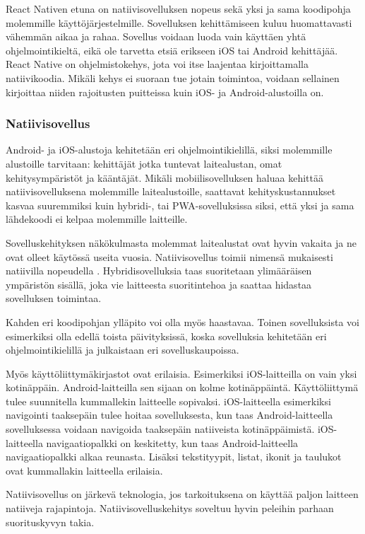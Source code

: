 \documentclass{tktltiki}
\begin{document}
React Nativen etuna on natiivisovelluksen nopeus sekä yksi ja sama koodipohja molemmille käyttöjärjestelmille. Sovelluksen kehittämiseen kuluu huomattavasti vähemmän aikaa ja rahaa. Sovellus voidaan luoda vain käyttäen yhtä ohjelmointikieltä, eikä ole tarvetta etsiä erikseen iOS tai Android kehittäjää. React Native on ohjelmistokehys, jota voi itse laajentaa kirjoittamalla natiivikoodia. Mikäli kehys ei suoraan tue jotain toimintoa, voidaan sellainen kirjoittaa niiden rajoitusten puitteissa kuin iOS- ja Android-alustoilla on.

\subsubsection{Natiivisovellus}

Android- ja iOS-alustoja kehitetään eri ohjelmointikielillä, siksi molemmille alustoille tarvitaan: kehittäjät jotka tuntevat laitealustan, omat kehitysympäristöt ja kääntäjät. Mikäli mobiilisovelluksen haluaa kehittää natiivisovelluksena molemmille laitealustoille, saattavat kehityskustannukset kasvaa suuremmiksi kuin hybridi-, tai PWA-sovelluksissa siksi, että yksi ja sama lähdekoodi ei kelpaa molemmille laitteille. 

Sovelluskehityksen näkökulmasta molemmat laitealustat ovat hyvin vakaita ja ne ovat olleet käytössä useita vuosia. Natiivisovellus toimii nimensä mukaisesti natiivilla nopeudella \cite{6588524}. Hybridisovelluksia taas suoritetaan ylimääräisen ympäristön sisällä, joka vie laitteesta suoritintehoa ja saattaa hidastaa sovelluksen toimintaa. 

Kahden eri koodipohjan ylläpito voi olla myös haastavaa. Toinen sovelluksista voi esimerkiksi olla edellä toista päivityksissä, koska sovelluksia kehitetään eri ohjelmointikielillä ja julkaistaan eri sovelluskaupoissa.

Myös käyttöliittymäkirjastot ovat erilaisia. Esimerkiksi iOS-laitteilla on vain yksi kotinäppäin. Android-laitteilla sen sijaan on kolme kotinäppäintä. \cite{Sojka} Käyttöliittymä tulee suunnitella kummallekin laitteelle sopivaksi. iOS-laitteella esimerkiksi navigointi taaksepäin tulee hoitaa sovelluksesta, kun taas Android-laitteella sovelluksessa voidaan navigoida taaksepäin natiiveista kotinäppäimistä. iOS-laitteella navigaatiopalkki on keskitetty, kun taas Android-laitteella navigaatiopalkki alkaa reunasta. Lisäksi tekstityypit, listat, ikonit ja taulukot ovat kummallakin laitteella erilaisia.

Natiivisovellus on järkevä teknologia, jos tarkoituksena on käyttää paljon laitteen natiiveja rajapintoja. Natiivisovelluskehitys soveltuu hyvin peleihin parhaan suorituskyvyn takia. 
\end{document}
